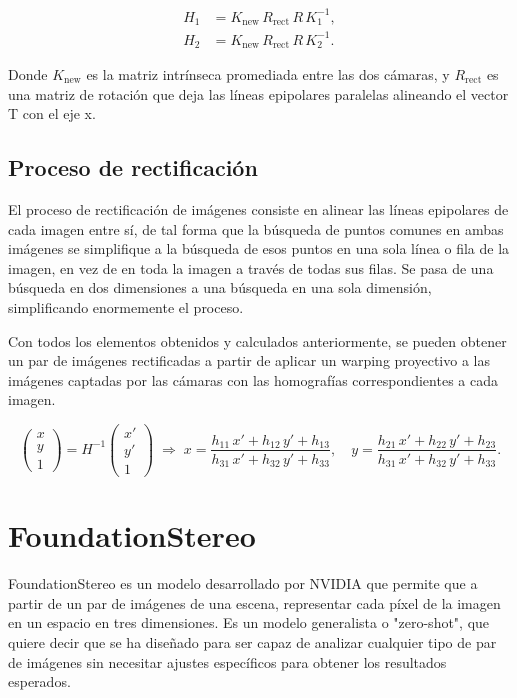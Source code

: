 \begin{align}
	H_1 &= K_{\text{new}}\,R_{\text{rect}}\,R\,K_1^{-1},\\
	H_2 &= K_{\text{new}}\,R_{\text{rect}}\,R\,K_2^{-1}.
\end{align}

Donde \(K_{\mathrm{new}}\) es la matriz intrínseca promediada entre las dos cámaras,  
y \(R_{\mathrm{rect}}\) es una matriz de rotación que deja las líneas epipolares paralelas alineando el vector T con el eje x.


\subsection{Proceso de rectificación}
El proceso de rectificación de imágenes consiste en alinear las líneas epipolares de cada imagen entre sí, de tal forma que la búsqueda de puntos comunes en ambas imágenes se simplifique a la búsqueda de esos puntos en una sola línea o fila de la imagen, en vez de en toda la imagen a través de todas sus filas. Se pasa de una búsqueda en dos dimensiones a una búsqueda en una sola dimensión, simplificando enormemente el proceso.

Con todos los elementos obtenidos y calculados anteriormente, se pueden obtener un par de imágenes rectificadas a partir de aplicar un warping proyectivo a las imágenes captadas por las cámaras con las homografías correspondientes a cada imagen.

\[
\begin{pmatrix}
	x \\[6pt]
	y \\[3pt]
	1
\end{pmatrix}
=
H^{-1}
\begin{pmatrix}
	x' \\[6pt]
	y' \\[3pt]
	1
\end{pmatrix}
\;\Longrightarrow\;
x = \frac{h_{11}\,x' + h_{12}\,y' + h_{13}}{h_{31}\,x' + h_{32}\,y' + h_{33}},
\quad
y = \frac{h_{21}\,x' + h_{22}\,y' + h_{23}}{h_{31}\,x' + h_{32}\,y' + h_{33}}.
\]


\section{FoundationStereo}
FoundationStereo \cite{wen2025foundationstereo} es un modelo desarrollado por NVIDIA que permite que a partir de un par de imágenes de una escena, representar cada píxel de la imagen en un espacio en tres dimensiones. Es un modelo generalista o "zero-shot", que quiere decir que se ha diseñado para ser capaz de analizar cualquier tipo de par de imágenes sin necesitar ajustes específicos para obtener los resultados esperados.

